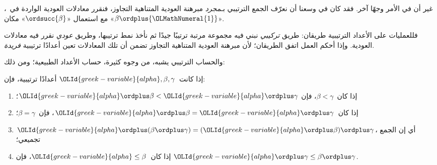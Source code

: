\documentclass[../../../include/open-logic-section]{subfiles}
\begin{document}
غير أن في الأمر وجهًا آخر. فقد كان في وسعنا أن نعرّف الجمع الترتيبي
بـ\emph{مجرد} مبرهنة العودية المتناهية التجاوز، فنقرر معادلات
العودية الواردة في~، مع استعمال
«$\ordsucc{\beta}$» مكان «$\beta \ordplus {\OLMathNumeral{1}}$».

فللعمليات على الأعداد الترتيبية طريقان: طريق \emph{تركيبي} نبني فيه
مجموعة مرتبة ترتيبًا جيدًا ثم نأخذ نمط ترتيبها، وطريق \emph{عودي}
نقرر فيه معادلات العودية. وإذا أحكم العمل اتفق الطريقان؛ لأن مبرهنة
العودية المتناهية التجاوز تضمن أن تلك المعادلات تعين أعدادًا ترتيبية
\emph{فريدة}.

والحساب الترتيبي يشبه، من وجوه كثيرة، حساب الأعداد الطبيعية؛ ومن ذلك:

\begin{lem}
إذا كانت~${\OLId{greek-variable}{alpha}}, \beta, \gamma$ أعدادًا ترتيبية، فإن:
\begin{enumerate}
	\item{} إذا كان~$\beta < \gamma$، فإن
	${\OLId{greek-variable}{alpha}} \ordplus \beta < {\OLId{greek-variable}{alpha}} \ordplus \gamma$؛
	\item{} إذا كان~${\OLId{greek-variable}{alpha}} \ordplus \beta =
	{\OLId{greek-variable}{alpha}}\ordplus \gamma$، فإن~$\beta = \gamma$؛
	\item{} ${\OLId{greek-variable}{alpha}} \ordplus (\beta \ordplus
	\gamma) = ({\OLId{greek-variable}{alpha}} \ordplus \beta) \ordplus \gamma$، أي إن الجمع
	تجميعي؛
	\item{} إذا كان~${\OLId{greek-variable}{alpha}} \leq \beta$، فإن
	${\OLId{greek-variable}{alpha}} \ordplus \gamma \leq \beta \ordplus \gamma$.
\end{enumerate}
\end{lem}
\end{document}
